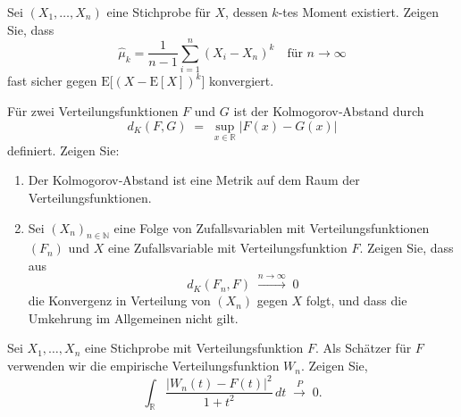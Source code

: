 \begin{aufgabe}
Sei \((X_1,\dots,X_n)\) eine Stichprobe für \(X\), dessen \(k\)-tes Moment existiert. Zeigen Sie, dass
\[
  \hat\mu_k
  = \frac{1}{n-1}
    \sum_{i=1}^n (X_i - X_n)^k
  \quad\text{für }n\to\infty
\]
fast sicher gegen \(\mathrm{E}\bigl[(X - \mathrm{E}[X])^k\bigr]\) konvergiert.
\end{aufgabe}

\begin{aufgabe}
Für zwei Verteilungsfunktionen \(F\) und \(G\) ist der Kolmogorov‑Abstand durch
\[
  d_K(F,G) \;=\; \sup_{x\in\mathbb{R}} \bigl|F(x) - G(x)\bigr|
\]
definiert. Zeigen Sie:
\begin{enumerate}
  \item Der Kolmogorov‑Abstand ist eine Metrik auf dem Raum der Verteilungsfunktionen.
  \item Sei \((X_n)_{n\in\mathbb{N}}\) eine Folge von Zufallsvariablen mit Verteilungsfunktionen \((F_n)\) und \(X\) eine Zufallsvariable mit Verteilungsfunktion \(F\). Zeigen Sie, dass aus
  \[
    d_K(F_n,F)\;\xrightarrow{n\to\infty}\;0
  \]
  die Konvergenz in Verteilung von \((X_n)\) gegen \(X\) folgt, und dass die Umkehrung im Allgemeinen nicht gilt.
\end{enumerate}
\end{aufgabe}

\begin{aufgabe}
Sei \(X_1,\dots,X_n\) eine Stichprobe mit Verteilungsfunktion \(F\). Als Schätzer für \(F\) verwenden wir die empirische Verteilungsfunktion \(W_n\). Zeigen Sie,
\[
  \int_{\mathbb{R}}
  \frac{\bigl|W_n(t) - F(t)\bigr|^2}{1 + t^2}\,dt
  \;\xrightarrow{P}\;0.
\]
\end{aufgabe}

